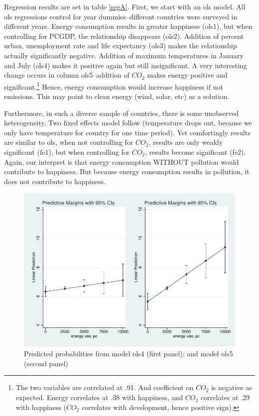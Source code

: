 \documentclass[10pt, letterpaper]{article}
\begin{document}
\begin{spacing}{1.0}
Regression results are set in table \ref{regA}. First, we start with an ols
model. All ols regressions control for year dummies--different countries
were surveyed in different years. Energy consumption results in greater
happiness (ols1), but when controlling for PCGDP, the relationship disappears
(ols2). Addition of percent urban, unemployment rate and life expectancy (ols3)
makes the relationship actually significantly negative.  Addition of maximum
temperatures in January and July (ols4) makes it positive again but still
insignificant.  A very interesting change  occurs in column ols5--addition of
$CO_2$ makes energy positive and significant.\footnote{The two variables are
  correlated at .91. And coefficient on $CO_2$ is negative as expected. Energy correlates at .38
  with happiness, and $CO_2$ correlates at .29 with happiness ($CO_2$ correlates with development,  hence positive sign).}
 Hence, energy consumption would increase happiness if not emissions. This may
 point to clean energy (wind, solar, etc) as a solution. 

Furthermore, in such a diverse sample of countries, there is some unobserved
heterogeneity. Two fixed effects model follow (temperature drops out, because we
 only have temperature for country for one time period). Yet comfortingly
 results are similar to ols, when not controlling for $CO_2$, results are only weakly
 significant (fe1), but when controlling for $CO_2$,  results become significant
 (fe2). Again, our interpret is that energy consumption WITHOUT pollution would
 contribute to happiness.  But because energy consumption results in pollution,
 it does not contribute to happiness.

\begin{figure}[H]
 \includegraphics[width=6in]{graphsAndTables/ols4ols5.pdf}\centering
\caption{Predicted probabilities from model  ols4 (first panel); and model ols5
  (second panel)%
}\label{ols4ols5}
\end{figure}



\end{spacing}
\end{document}
